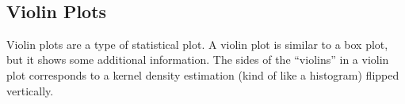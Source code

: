 \documentclass{book}
\begin{document}
    \begin{center}
    \end{center}
    { \hspace*{\fill} \\}
    

    
        \subsection{Violin Plots}\label{violin-plots}
    




    
        Violin plots are a type of statistical plot. A violin plot is similar to
a box plot, but it shows some additional information. The sides of the
``violins'' in a violin plot corresponds to a kernel density estimation
(kind of like a histogram) flipped vertically.
    
\end{document}
